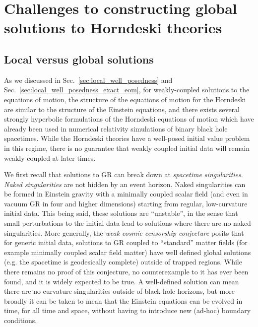 \documentclass{ws-ijmpd}
\begin{document}
\section{Challenges to constructing global solutions to
   Horndeski theories
   \label{sec:failure_global}
}
\subsection{Local versus global solutions\label{sec:local_vs_global_solutions}}
As we discussed in
Sec.~\ref{sec:local_well_posedness} and 
Sec.~\ref{sec:local_well_posedness_exact_eom},
for weakly-coupled solutions to the equations of motion, 
the structure of the equations of motion for the Horndeski 
are similar to the structure of the Einstein equations,
and there exists several strongly hyperbolic
formulations of the Horndeski equations of motion which have already
been used in numerical relativity simulations of binary black hole
spacetimes\cite{East:2020hgw,Figueras:2021abd,East:2021bqk}.
While the Horndeski theories have a well-posed initial 
value problem in this regime, there is no guarantee that 
weakly coupled initial data 
will remain weakly coupled at later times.

We first recall that solutions to GR can break down at 
\emph{spacetime singularities}\cite{hawking_ellis_1973}.
\emph{Naked singularities} are not hidden by an event horizon.
Naked singularities can be formed in Einstein gravity
with a minimally coupled scalar
field\cite{10.2307/2118619}
(and even in vacuum GR in four and higher\cite{Zhang:2015rsa} dimensions)
starting from regular, low-curvature initial data.
This being said, 
these solutions are ``unstable''\cite{christodoulou1999instability},
in the sense that small perturbations to the initial data lead to solutions
where there are no naked singularities.
More generally, the 
\emph{weak cosmic censorship conjecture}\cite{1969NCimR...1..252P}
posits that for generic initial data,
solutions to GR coupled to ``standard'' matter fields (for example 
minimally coupled scalar field matter) have well defined global
solutions (e.g. the spacetime is geodesically complete)
outside of trapped regions.
While there remains no proof of this conjecture, no counterexample to it
has ever been found, and it is widely expected to be true\cite{Wald:1997wa}.
A well-defined solution can mean there are no curvature singularities outside
of black hole horizons, 
but more broadly it can be taken to
mean that the Einstein equations can be evolved in time,
for all time and space, without having to introduce new (ad-hoc)
boundary conditions.
\end{document}
